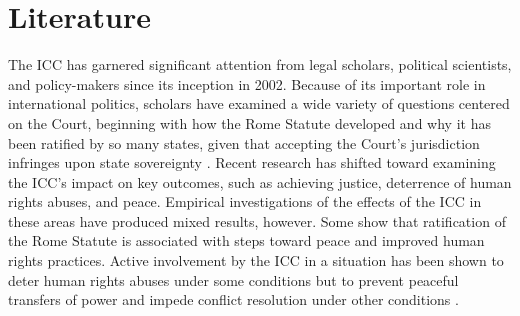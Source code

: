 \section*{Literature}

The ICC has garnered significant attention from legal scholars, political scientists, and policy-makers since its inception in 2002. Because of its important role in international politics, scholars have examined a wide variety of questions centered on the Court, beginning with how the Rome Statute developed \citep{deitelhoff2009discursive, fehl2004explaining, goodliffe2009funny} and why it has been ratified by so many states, given that accepting the Court's jurisdiction infringes upon state sovereignty \citep{chapman2013ratification, meernik2011promoting, simmons2010credible}. Recent research has shifted toward examining the ICC's impact on key outcomes, such as achieving justice, deterrence of human rights abuses, and peace. Empirical investigations of the effects of the ICC in these areas have produced mixed results, however. Some show that ratification of the Rome Statute is associated with steps toward peace \citep{simmons2010credible} and improved human rights practices\citep{appel2018shadow}. Active involvement by the ICC in a situation has been shown to deter human rights abuses under some conditions \citep{bocchese2015coercing, hillebrecht2016deterrent, jo2016can} but to prevent peaceful transfers of power \citep{ku2006international, nalepa2016role} and impede conflict resolution under other conditions \citep{prorok2017compatibility}.

